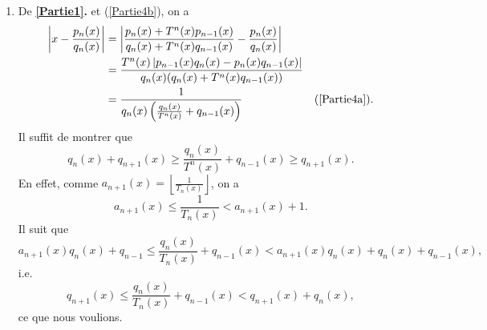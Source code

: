 \documentclass[french]{article}
\theoremstyle{definition}
\newcommand{\tuple}[1]{\left(#1\right)}
\newcommand{\abs}[1]{\left|#1\right|}
\newcommand{\floor}[1]{\left\lfloor#1\right\rfloor}
\begin{document}
\begin{enumerate}
\begin{enumerate}
        \item \label{Partie4c} De {\bf\ref{Partie1}.} et (\ref{Partie4b}), on a
            \begin{align*}
                \abs{x - \frac{p_n(x)}{q_n(x)}} & = \abs{\frac{p_n(x) + T^n(x)p_{n-1}(x)}{q_n(x) + T^n(x)q_{n-1}(x)} - \frac{p_n(x)}{q_n(x)}} \\
                & = \frac{T^n(x) \abs{p_{n-1}(x)q_n(x) - p_n(x)q_{n-1}(x)}}{q_n(x)(q_n(x) + T^n(x)q_{n-1}(x))} \\
                & = \frac{1}{q_n(x)\tuple{\frac{q_n(x)}{T^n(x)} + q_{n-1}(x)}} & (\ref{Partie4a}).
            \end{align*}
        Il suffit de montrer que
            $$q_n(x) + q_{n+1}(x) \ge \frac{q_n(x)}{T^n(x)} + q_{n-1}(x) \ge q_{n+1}(x).$$
        En effet, comme $a_{n+1}(x) = \floor{\frac{1}{T_n(x)}}$, on a
            $$a_{n+1}(x) \le \frac{1}{T_n(x)} < a_{n+1}(x) + 1.$$
        Il suit que
            $$a_{n+1}(x)q_n(x) + q_{n-1} \le \frac{q_n(x)}{T_n(x)} + q_{n-1}(x) < a_{n+1}(x)q_n(x) + q_n(x) + q_{n-1}(x),$$
        i.e.
            $$q_{n+1}(x) \le \frac{q_n(x)}{T_n(x)} + q_{n-1}(x) < q_{n+1}(x) + q_n(x),$$
        ce que nous voulions.
    \end{enumerate}
    

\end{enumerate}
\end{document}
